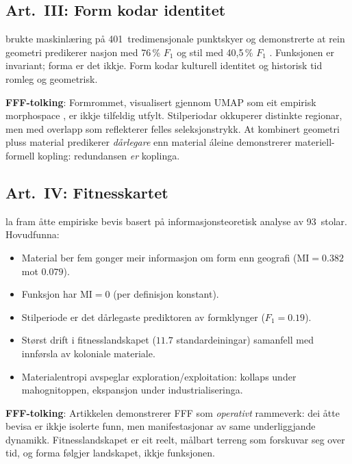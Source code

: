 \documentclass[12pt,a4paper]{article}
\begin{document}
\subsection{Art.~III: Form kodar identitet}

\citet{finne2026c} brukte maskinl\ae{}ring p\aa{} 401~tredimensjonale punktskyer og demonstrerte at rein geometri predikerer nasjon med 76\,\% $F_1$ og stil med 40{,}5\,\% $F_1$ \citep{breiman2001}. Funksjonen er invariant; forma er det ikkje. Form kodar kulturell identitet og historisk tid romleg og geometrisk.

\textbf{FFF-tolking}: Formrommet, visualisert gjennom UMAP som eit empirisk morphospace \citep{raup1966}, er ikkje tilfeldig utfylt. Stilperiodar okkuperer distinkte regionar, men med overlapp som reflekterer felles seleksjonstrykk. At kombinert geometri pluss material predikerer \emph{d\aa{}rlegare} enn material \'aleine demonstrerer materiell-formell kopling: redundansen \emph{er} koplinga.

\subsection{Art.~IV: Fitnesskartet}

\citet{finne2026d} la fram \aa{}tte empiriske bevis basert p\aa{} informasjonsteoretisk analyse av 93~stolar. Hovudfunna:

\begin{itemize}[nosep]
    \item Material ber fem gonger meir informasjon om form enn geografi ($\mathrm{MI} = 0.382$ mot $0.079$).
    \item Funksjon har $\mathrm{MI} = 0$ (per definisjon konstant).
    \item Stilperiode er det d\aa{}rlegaste prediktoren av formklynger ($F_1 = 0.19$).
    \item St\o{}rst drift i fitnesslandskapet ($11.7$ standardeiningar) samanfell med innf\o{}rsla av koloniale materiale.
    \item Materialentropi avspeglar exploration/exploitation: kollaps under mahognitoppen, ekspansjon under industrialiseringa.
\end{itemize}

\textbf{FFF-tolking}: Artikkelen demonstrerer FFF som \emph{operativt} rammeverk: dei \aa{}tte bevisa er ikkje isolerte funn, men manifestasjonar av same underliggjande dynamikk. Fitnesslandskapet er eit reelt, m\aa{}lbart terreng som forskuvar seg over tid, og forma f\o{}lgjer landskapet, ikkje funksjonen.
\end{document}
